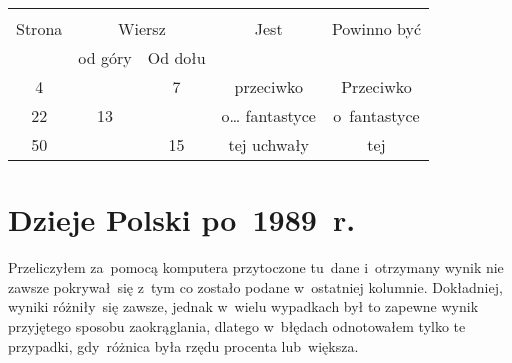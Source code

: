 \documentclass[a4paper,11pt]{article}
\begin{document}


\begin{center}

  \begin{tabular}{|c|c|c|c|c|}
    \hline
    & \multicolumn{2}{c|}{} & & \\
    Strona & \multicolumn{2}{c|}{Wiersz} & Jest
                              & Powinno być \\ \cline{2-3}
    & od góry & Od dołu & & \\
    \hline
    4   & &  7 & przeciwko & Przeciwko \\
    22  & 13 & & o\ldots{} fantastyce & o~fantastyce \\ %
    50  & & 15 & tej uchwały & tej \\
    \hline
  \end{tabular}

\end{center}

\vspace{\spaceTwo}










\section{Dzieje Polski po~1989~r.}

\vspace{\spaceTwo}







\start {} Przeliczyłem za~pomocą komputera przytoczone tu~dane
i~otrzymany wynik nie zawsze pokrywał~się z~tym co zostało podane
w~ostatniej kolumnie. Dokładniej, wyniki różniły~się zawsze, jednak
w~wielu wypadkach był to zapewne wynik przyjętego sposobu
zaokrąglania, dlatego w~błędach odnotowałem tylko te przypadki,
gdy~różnica była rzędu procenta lub~większa.
\end{document}
